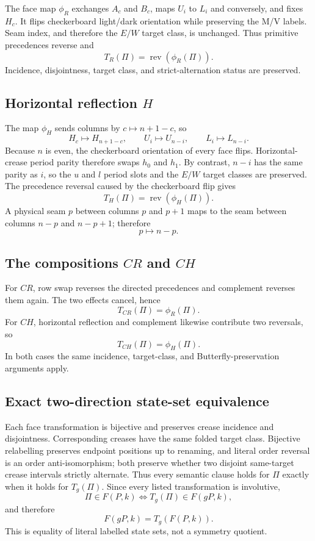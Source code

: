 \documentclass[11pt]{article}
\theoremstyle{definition}
\theoremstyle{remark}
\begin{document}
The face map \(\phi_R\) exchanges \(A_c\) and \(B_c\), maps \(U_i\) to
\(L_i\) and conversely, and fixes \(H_c\). It flips checkerboard
light/dark orientation while preserving the M/V labels. Seam index, and
therefore the \(E/W\) target class, is unchanged. Thus primitive
precedences reverse and \[
T_R(\Pi)=\operatorname{rev}(\phi_R(\Pi)).
\] Incidence, disjointness, target class, and strict-alternation status
are preserved.

\subsection{\texorpdfstring{Horizontal reflection
\(H\)}{Horizontal reflection H}}\label{b.3.-horizontal-reflection-h}

The map \(\phi_H\) sends columns by \(c\mapsto n+1-c\), so \[
H_c\mapsto H_{n+1-c},\qquad
U_i\mapsto U_{n-i},\qquad
L_i\mapsto L_{n-i}.
\] Because \(n\) is even, the checkerboard orientation of every face
flips. Horizontal-crease period parity therefore swaps \(h_0\) and
\(h_1\). By contrast, \(n-i\) has the same parity as \(i\), so the \(u\)
and \(l\) period slots and the \(E/W\) target classes are preserved. The
precedence reversal caused by the checkerboard flip gives \[
T_H(\Pi)=\operatorname{rev}(\phi_H(\Pi)).
\] A physical seam \(p\) between columns \(p\) and \(p+1\) maps to the
seam between columns \(n-p\) and \(n-p+1\); therefore \[
p\longmapsto n-p.
\]

\subsection{\texorpdfstring{The compositions \(CR\) and
\(CH\)}{The compositions CR and CH}}\label{b.4.-the-compositions-cr-and-ch}

For \(CR\), row swap reverses the directed precedences and complement
reverses them again. The two effects cancel, hence \[
T_{CR}(\Pi)=\phi_R(\Pi).
\] For \(CH\), horizontal reflection and complement likewise contribute
two reversals, so \[
T_{CH}(\Pi)=\phi_H(\Pi).
\] In both cases the same incidence, target-class, and
Butterfly-preservation arguments apply.

\subsection{Exact two-direction state-set
equivalence}\label{b.5.-exact-two-direction-state-set-equivalence}

Each face transformation is bijective and preserves crease incidence and
disjointness. Corresponding creases have the same folded target class.
Bijective relabelling preserves endpoint positions up to renaming, and
literal order reversal is an order anti-isomorphism; both preserve
whether two disjoint same-target crease intervals strictly alternate.
Thus every semantic clause holds for \(\Pi\) exactly when it holds for
\(T_g(\Pi)\). Since every listed transformation is involutive, \[
\Pi\in F(P,k)\iff T_g(\Pi)\in F(gP,k),
\] and therefore \[
F(gP,k)=T_g(F(P,k)).
\] This is equality of literal labelled state sets, not a symmetry
quotient.
\end{document}
